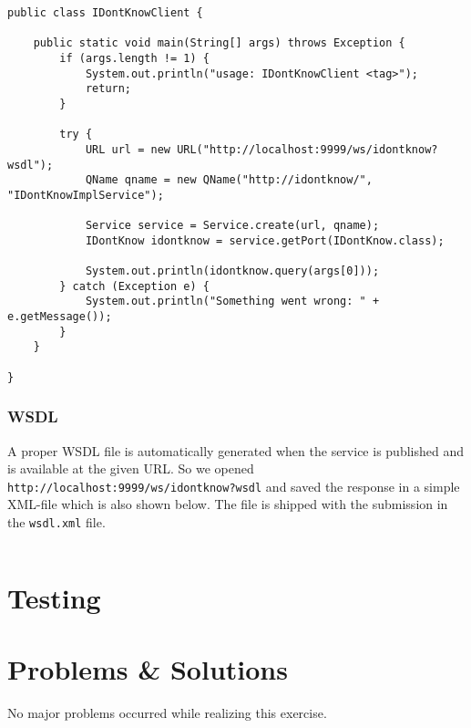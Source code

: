 \documentclass[11pt, a4paper]{article}
\begin{document}
\begin{lstlisting}
public class IDontKnowClient {

	public static void main(String[] args) throws Exception {
		if (args.length != 1) {
			System.out.println("usage: IDontKnowClient <tag>");
			return;
		}

		try {
			URL url = new URL("http://localhost:9999/ws/idontknow?wsdl");
			QName qname = new QName("http://idontknow/", "IDontKnowImplService");

			Service service = Service.create(url, qname);
			IDontKnow idontknow = service.getPort(IDontKnow.class);

			System.out.println(idontknow.query(args[0]));
		} catch (Exception e) {
			System.out.println("Something went wrong: " + e.getMessage());
		}
	}

}
\end{lstlisting}

\subsubsection{WSDL}

A proper WSDL file is automatically generated when the service is published and is available at the given URL. So we opened \lstinline|http://localhost:9999/ws/idontknow?wsdl| and saved the response in a simple XML-file which is also shown below. The file is shipped with the submission in the \lstinline|wsdl.xml| file.

\begin{lstlisting}

\end{lstlisting}

\section{Testing}

\section{Problems \& Solutions}

No major problems occurred while realizing this exercise.

\nocite{*}


\end{document}
